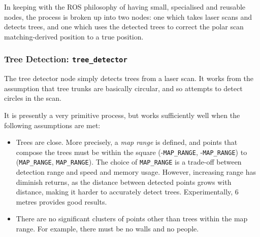 \documentclass[12pt,oneside,a4paper]{book}
\begin{document}
In keeping with the ROS philosophy of having small, specialised and
reusable nodes, the process is broken up into two nodes: one which
takes laser scans and detects trees, and one which uses the detected
trees to correct the polar scan matching-derived position to a true
position.

\subsubsection{Tree Detection: \texttt{tree\_detector}}
\label{sec:tree_detector}

The tree detector node simply detects trees from a laser scan. It
works from the assumption that tree trunks are basically circular, and
so attempts to detect circles in the scan.

It is presently a very primitive process, but works sufficiently well
when the following assumptions are met:
\begin{itemize}
\item Trees are close. More precisely, a \emph{map range} is defined,
  and points that compose the trees must be within the square
  (-\texttt{MAP\_RANGE}, -\texttt{MAP\_RANGE}) to (\texttt{MAP\_RANGE},
  \texttt{MAP\_RANGE}). The choice of \texttt{MAP\_RANGE} is a trade-off
  between detection range and speed and memory usage. However,
  increasing range has diminish returns, as the distance between
  detected points grows with distance, making it harder to accurately
  detect trees. Experimentally, 6 metres provides good results.
\item There are no significant clusters of points other than trees
  within the map range. For example, there must be no walls and no
  people.
\end{itemize}
\end{document}
